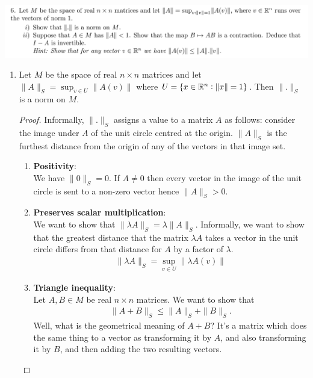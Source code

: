 \documentclass[12pt]{article}
\begin{document}
\newpage
\subsection{}



\begin{mdframed}
\includegraphics[width=400pt]{img/oxford-a2-2-6.png}
\end{mdframed}

\begin{enumerate}
\item
  \begin{claim*}
    Let $M$ be the space of real $n \times n$ matrices and let $\|A\|_S = \sup_{v \in U} \|A(v)\|$
    where $U = \{x \in \mathbb{R}^n : \|x\| = 1\}$. Then $\|.\|_S$ is a norm on $M$.
  \end{claim*}
  \begin{proof}
    Informally, $\|.\|_S$ assigns a value to a matrix $A$ as follows: consider the image under $A$ of
    the unit circle centred at the origin. $\|A\|_S$ is the furthest distance from the origin of any
    of the vectors in that image set.
    \begin{enumerate}
    \item {\bf Positivity}:\\
      We have $\|0\|_S = 0$. If $A \neq 0$ then every vector in the image of the unit circle is
      sent to a non-zero vector hence $\|A\|_S > 0$.
    \item {\bf Preserves scalar multiplication}:\\
      We want to show that $\|\lambda A\|_S = \lambda \|A\|_S$. Informally, we want to show that the
      greatest distance that the matrix $\lambda A$ takes a vector in the unit circle differs from
      that distance for $A$ by a factor of $\lambda$.
      \begin{align*}
        \|\lambda A\|_S = \sup_{v \in U} \|\lambda A(v)\|
      \end{align*}
        \todo{}
      \item {\bf Triangle inequality}:\\
        Let $A, B \in M$ be real $n \times n$ matrices. We want to show that
      \begin{align*}
        \|A + B\|_S \leq \|A\|_S + \|B\|_S.
      \end{align*}
      Well, what is the geometrical meaning of $A + B$? It's a matrix which does the same thing to
      a vector as transforming it by $A$, and also transforming it by $B$, and then adding the two
      resulting vectors.


\end{enumerate}
\end{proof}
\end{enumerate}
\end{document}
